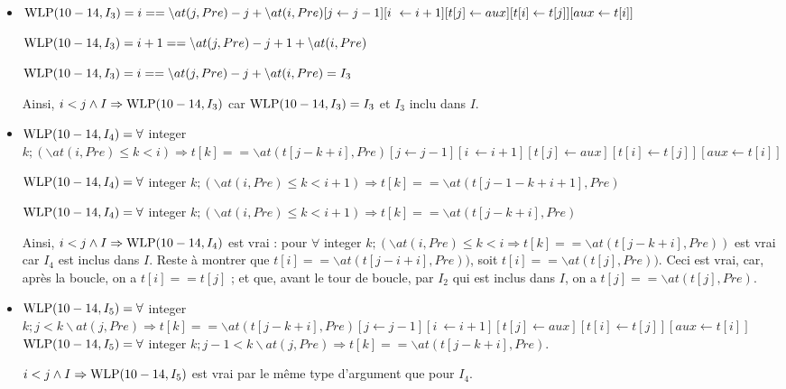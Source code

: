 \documentclass[11pt,answers]{exam}
\begin{document}
\begin{questions}
\begin{parts}
\begin{solutionorbox}
\begin{itemize}
            \item $\WLP(10-14,I_3) = i == \backslash at(j, Pre) -j  + \backslash at(i, Pre ) [j \leftarrow j-1][i \ \leftarrow i+1][t[j] \leftarrow aux][t[i] \leftarrow t[j]][aux \leftarrow t[i]]$

                $\mathrm{WLP}(10-14,I_3) = i+1 == \backslash at(j, Pre) -j +1  + \backslash at(i, Pre )$

                $\mathrm{WLP}(10-14,I_3) = i == \backslash at(j, Pre) -j  + \backslash at(i, Pre ) = I_3$

                Ainsi, $i < j \land I \Rightarrow \mathrm{WLP}(10-14,I_3)$ car $\mathrm{WLP}(10-14,I_3) = I_3$ et $I_3$ inclu dans $I$.
            
            \item  $\mathrm{WLP}(10-14,I_4) = \forall$ integer $k; (\backslash at(i, Pre) \leq k<i) \Rightarrow t[k] == \backslash at(t[j- k + i], Pre)[j \leftarrow j-1][i \ \leftarrow i+1][t[j] \leftarrow aux][t[i] \leftarrow t[j]][aux \leftarrow t[i]]$

            $\mathrm{WLP}(10-14,I_4) = \forall$ integer $k; (\backslash at(i, Pre) \leq k<i+1) \Rightarrow t[k] == \backslash at(t[j-1- k + i+1], Pre)$

            $\mathrm{WLP}(10-14,I_4) = \forall$ integer $k; (\backslash at(i, Pre) \leq k<i+1) \Rightarrow t[k] == \backslash at(t[j- k + i], Pre)$

                Ainsi, $i < j \land I \Rightarrow \mathrm{WLP}(10-14,I_4)$ est vrai : pour $ \forall$ integer $k; (\backslash at(i, Pre) \leq k<i \Rightarrow t[k] == \backslash at(t[j- k + i], Pre))$ est vrai car $I_4$ est inclus dans $I$.
                Reste à montrer que $t[i] == \backslash at(t[j- i + i], Pre))$, soit  $t[i] == \backslash at(t[j], Pre))$.
                Ceci est vrai, car, après la boucle, on a $t[i] == t[j]$ ; et que, avant le tour de boucle, par $I_2$ qui est inclus dans $I$, on a $t[j] == \backslash at(t[j], Pre)$.

            \item $\mathrm{WLP}(10-14,I_5) = \forall$ integer $k; j<k\backslash at(j, Pre) \Rightarrow t[k] == \backslash at(t[j- k + i], Pre)[j \leftarrow j-1][i \ \leftarrow i+1][t[j] \leftarrow aux][t[i] \leftarrow t[j]][aux \leftarrow t[i]]$
            $\mathrm{WLP}(10-14,I_5) = \forall$ integer $k; j-1<k\backslash at(j, Pre) \Rightarrow t[k] == \backslash at(t[j- k + i], Pre)$.
            
            $i < j \land I \Rightarrow \mathrm{WLP}(10-14,I_5)$ est vrai par le même type d'argument que pour $I_4$.


\end{itemize}
\end{solutionorbox}
\end{parts}
\end{questions}
\end{document}
